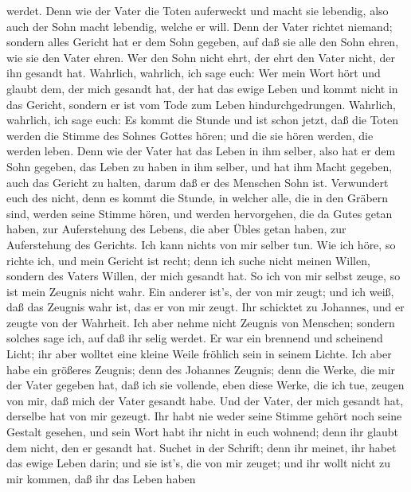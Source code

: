 werdet.  Denn wie der Vater die Toten auferweckt und macht
sie lebendig, also auch der Sohn macht lebendig, welche er will.
 Denn der Vater richtet niemand; sondern alles Gericht hat
er dem Sohn gegeben,  auf daß sie alle den Sohn ehren, wie
sie den Vater ehren. Wer den Sohn nicht ehrt, der ehrt den Vater nicht,
der ihn gesandt hat.  Wahrlich, wahrlich, ich sage euch:
Wer mein Wort hört und glaubt dem, der mich gesandt hat, der hat das
ewige Leben und kommt nicht in das Gericht, sondern er ist vom Tode zum
Leben hindurchgedrungen.  Wahrlich, wahrlich, ich sage
euch: Es kommt die Stunde und ist schon jetzt, daß die Toten werden die
Stimme des Sohnes Gottes hören; und die sie hören werden, die werden
leben.  Denn wie der Vater hat das Leben in ihm selber,
also hat er dem Sohn gegeben, das Leben zu haben in ihm selber,
 und hat ihm Macht gegeben, auch das Gericht zu halten,
darum daß er des Menschen Sohn ist.  Verwundert euch des
nicht, denn es kommt die Stunde, in welcher alle, die in den Gräbern
sind, werden seine Stimme hören,  und werden hervorgehen,
die da Gutes getan haben, zur Auferstehung des Lebens, die aber Übles
getan haben, zur Auferstehung des Gerichts.  Ich kann
nichts von mir selber tun. Wie ich höre, so richte ich, und mein Gericht
ist recht; denn ich suche nicht meinen Willen, sondern des Vaters
Willen, der mich gesandt hat.  So ich von mir selbst zeuge,
so ist mein Zeugnis nicht wahr.  Ein anderer ist's, der von
mir zeugt; und ich weiß, daß das Zeugnis wahr ist, das er von mir zeugt.
 Ihr schicktet zu Johannes, und er zeugte von der Wahrheit.
 Ich aber nehme nicht Zeugnis von Menschen; sondern solches
sage ich, auf daß ihr selig werdet.  Er war ein brennend
und scheinend Licht; ihr aber wolltet eine kleine Weile fröhlich sein in
seinem Lichte.  Ich aber habe ein größeres Zeugnis; denn
des Johannes Zeugnis; denn die Werke, die mir der Vater gegeben hat, daß
ich sie vollende, eben diese Werke, die ich tue, zeugen von mir, daß
mich der Vater gesandt habe.  Und der Vater, der mich
gesandt hat, derselbe hat von mir gezeugt. Ihr habt nie weder seine
Stimme gehört noch seine Gestalt gesehen,  und sein Wort
habt ihr nicht in euch wohnend; denn ihr glaubt dem nicht, den er
gesandt hat.  Suchet in der Schrift; denn ihr meinet, ihr
habet das ewige Leben darin; und sie ist's, die von mir zeuget;
 und ihr wollt nicht zu mir kommen, daß ihr das Leben haben
